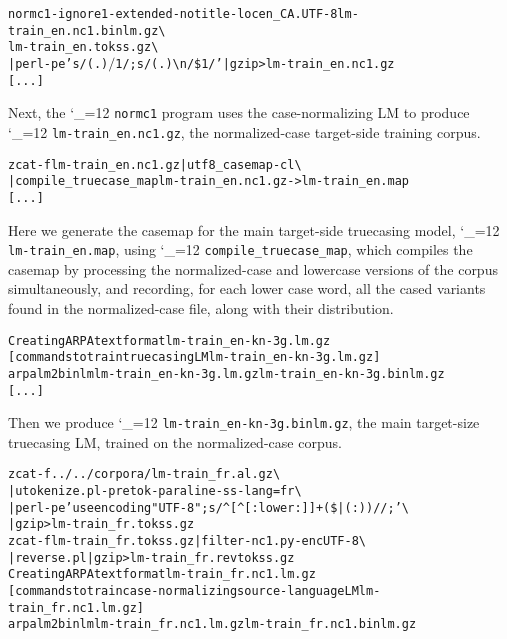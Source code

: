 \documentclass[11pt,letterpaper]{article}
\newcommand{\bs}{\textbackslash{}}
\def\code{\begingroup\catcode`\_=12 \codex}
\newcommand{\codex}[1]{\texttt{#1}\endgroup}
\begin{document}
\begin{small}
\begin{alltt}
   normc1 -ignore 1 -extended -notitle -loc en_CA.UTF-8 lm-train_en.nc1.binlm.gz \bs
        lm-train_en.tokss.gz \bs
        | perl -pe 's/(.)$/$1 /; s/(.){\bs}n/\$1/' | gzip > lm-train_en.nc1.gz
   [...]
\end{alltt}
\end{small}

Next, the \code{normc1} program uses the case-normalizing LM to produce
\code{lm-train_en.nc1.gz}, the nor\-malized-case target-side training corpus.

\begin{small}
\begin{alltt}
   zcat -f lm-train_en.nc1.gz |  utf8_casemap -c l \bs
        | compile_truecase_map lm-train_en.nc1.gz - > lm-train_en.map
   [...]
\end{alltt}
\end{small}

Here we generate the casemap for the main target-side truecasing model,
\code{lm-train_en.map}, using \code{compile_truecase_map}, which compiles the
casemap by processing the normalized-case and lowercase versions of the corpus
simultaneously, and recording, for each lower case word, all the cased variants
found in the normalized-case file, along with their distribution.

\begin{small}
\begin{alltt}
   Creating ARPA text format lm-train_en-kn-3g.lm.gz
   [commands to train truecasing LM lm-train_en-kn-3g.lm.gz]
   arpalm2binlm lm-train_en-kn-3g.lm.gz lm-train_en-kn-3g.binlm.gz
   [...]
\end{alltt}
\end{small}

Then we produce \code{lm-train_en-kn-3g.binlm.gz}, the main target-size
truecasing LM, trained on the normalized-case corpus.

\begin{small}
\begin{alltt}
   zcat -f ../../corpora/lm-train_fr.al.gz \bs
        | utokenize.pl -pretok -paraline -ss -lang=fr \bs
        | perl -pe 'use encoding "UTF-8"; s/^[^[:lower:]]+(\$|( : ))//;' \bs
        | gzip > lm-train_fr.tokss.gz
   zcat -f lm-train_fr.tokss.gz | filter-nc1.py -enc UTF-8 \bs
        | reverse.pl | gzip > lm-train_fr.revtokss.gz
   Creating ARPA text format lm-train_fr.nc1.lm.gz
   [commands to train case-normalizing source-language LM lm-train_fr.nc1.lm.gz]
   arpalm2binlm lm-train_fr.nc1.lm.gz lm-train_fr.nc1.binlm.gz
\end{alltt}
\end{small}
\end{document}
